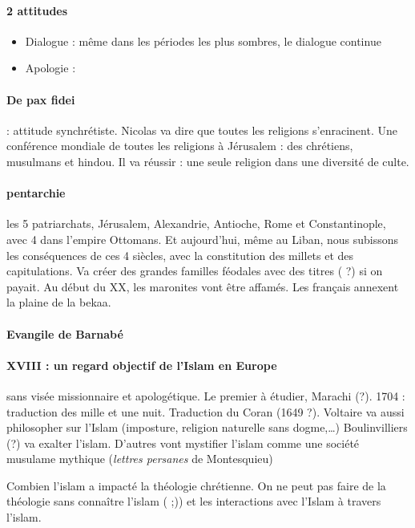 \paragraph{2 attitudes}
\begin{itemize}
    \item Dialogue : même dans les périodes les plus sombres, le dialogue continue
    \item Apologie : 
\end{itemize}



\paragraph{De pax fidei} : attitude synchrétiste. Nicolas va dire que toutes les religions s’enracinent. Une conférence mondiale de toutes les religions à Jérusalem : des chrétiens, musulmans et hindou. Il va réussir : une seule religion dans une diversité de culte.     

\paragraph{pentarchie} les 5 patriarchats, Jérusalem, Alexandrie, Antioche, Rome et Constantinople, avec 4 dans l’empire Ottomans. Et aujourd’hui, même au Liban, nous subissons les conséquences de ces 4 siècles, avec la constitution des millets et des capitulations.  Va créer des grandes familles féodales avec des titres ( ?) si on payait.  Au début du XX, les maronites vont être affamés. Les français annexent la plaine de la bekaa.

\paragraph{Evangile de Barnabé}

\paragraph{XVIII : un regard objectif de l’Islam en Europe} sans visée missionnaire et apologétique. Le premier à étudier, Marachi (?). 1704 : traduction des mille et une nuit. Traduction du Coran (1649 ?). Voltaire va aussi philosopher sur l’Islam (imposture, religion naturelle sans dogme,…) Boulinvilliers (?) va exalter l’islam. D’autres vont mystifier l’islam comme une société musulame mythique (\textit{lettres persanes }de Montesquieu)

Combien l’islam a impacté la théologie chrétienne. On ne peut pas faire de la théologie sans connaître l’islam ( ;)) et les interactions avec l’Islam à travers l’islam.                  










